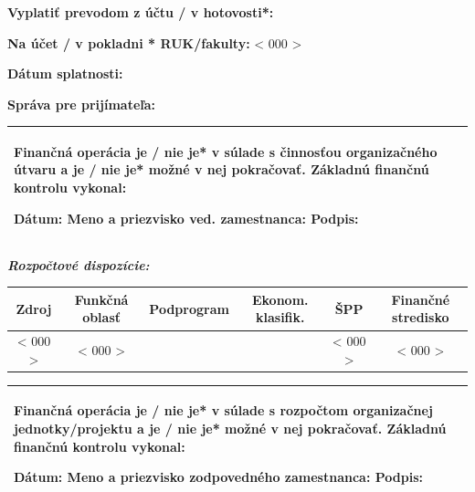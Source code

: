 \documentclass[10pt,a4paper]{article}
\newcommand{\placeholder}[1]{< #1 >}
\newcommand{\source}{\placeholder{000}}
\newcommand{\functionalRegion}{\placeholder{000}}
\newcommand{\sppSymbol}{\placeholder{000}}
\newcommand{\financialCentre}{\placeholder{000}}
\newcommand{\iban}{\placeholder{000}}
\begin{document}
\vspace*{-0.5em}
\begin{spacing}{1.5}
	\textbf{Vyplatiť prevodom z účtu / v hotovosti*:}
	
	\textbf{Na účet / v pokladni * RUK/fakulty:} \iban
	
	\textbf{Dátum splatnosti:}
	
	\textbf{Správa pre prijímateľa:}
\end{spacing}

\bgroup
\def\arraystretch{2}
\begin{table}[h]
\centering
\begin{tabularx}{\linewidth}{|X|}
	\hline
	Finančná operácia \textbf{je / nie je}* v súlade s činnosťou organizačného útvaru a \textbf{je / nie je}* možné v nej pokračovať. Základnú finančnú kontrolu vykonal:
	
	\vspace*{1em}
	
	Dátum: \hspace{2cm} Meno a priezvisko ved. zamestnanca: \hspace{3.4cm} Podpis:  	\vspace*{1em}\\ \hline
\end{tabularx}
\end{table}
\egroup

\vspace*{-0.5em}
\textbf{\textit{Rozpočtové dispozície:}}
\vspace*{-0.5em}

\begin{table}[h!]
\centering
\bgroup
\def\arraystretch{1.5}
\begin{tabularx}{\linewidth}{|c|c|c|C|C|C|}
	\hline
	\textbf{Zdroj} & \textbf{Funkčná oblasť} & \textbf{Podprogram} & \textbf{Ekonom. klasifik.} & \textbf{ŠPP} & \textbf{Finančné stredisko} \\ \hline
	\source & \functionalRegion & & & \sppSymbol & \financialCentre \\ \hline
\end{tabularx}
\egroup

\bgroup
\def\arraystretch{2}
\begin{tabularx}{\linewidth}{|X|}
	Finančná operácia \textbf{je / nie je}* v súlade s rozpočtom organizačnej jednotky/projektu a \textbf{je / nie je}* možné v nej pokračovať. Základnú finančnú kontrolu vykonal:
	
	\vspace*{1em}
	
	Dátum: \hspace{2cm} Meno a priezvisko zodpovedného zamestnanca: \hspace{1.95cm} Podpis: \vspace*{2em} \\ \hline
\end{tabularx}
\egroup
\end{table}
\end{document}
